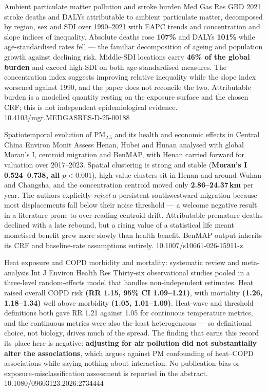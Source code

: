 \documentclass[10pt]{article}
\begin{document}

{Ambient particulate matter pollution and stroke burden}
{Med Gas Res}
{GBD 2021 stroke deaths and DALYs attributable to ambient particulate matter, decomposed
by region, sex and SDI over 1990--2021 with EAPC trends and concentration and slope indices
of inequality. Absolute deaths rose \textbf{107\%} and DALYs \textbf{101\%} while
age-standardised rates fell --- the familiar decomposition of ageing and population growth
against declining risk. Middle-SDI locations carry \textbf{46\% of the global burden} and
exceed high-SDI on both age-standardised measures. The concentration index suggests
improving relative inequality while the slope index worsened against 1990, and the paper
does not reconcile the two. Attributable burden is a modelled quantity resting on the
exposure surface and the chosen CRF; this is not independent epidemiological evidence.}
{10.4103/mgr.MEDGASRES-D-25-00188}

{Spatiotemporal evolution of PM$_{2.5}$ and its health and economic effects in Central
China}
{Environ Monit Assess}
{Henan, Hubei and Hunan analysed with global Moran's I, centroid migration and BenMAP,
with Henan carried forward for valuation over 2017--2023. Spatial clustering is strong and
stable (\textbf{Moran's I 0.524--0.738, all $p<0.001$}), high-value clusters sit in Henan
and around Wuhan and Changsha, and the concentration centroid moved only
\textbf{2.86--24.37\,km} per year. The authors explicitly \emph{reject} a persistent
southwestward migration because most displacements fall below their noise threshold ---
a welcome negative result in a literature prone to over-reading centroid drift.
Attributable premature deaths declined with a late rebound, but a rising value of a
statistical life meant monetised benefit grew more slowly than health benefit. BenMAP
output inherits its CRF and baseline-rate assumptions entirely.}
{10.1007/s10661-026-15911-z}

\clearpage


{Heat exposure and COPD morbidity and mortality: systematic review and meta-analysis}
{Int J Environ Health Res}
{Thirty-six observational studies pooled in a three-level random-effects model that
handles non-independent estimates. Heat raised overall COPD risk
\textbf{(RR 1.15, 95\% CI 1.09--1.21)}, with mortality \textbf{(1.26, 1.18--1.34)} well
above morbidity \textbf{(1.05, 1.01--1.09)}. Heat-wave and threshold definitions both gave
RR 1.21 against 1.05 for continuous temperature metrics, and the continuous metrics were
also the least heterogeneous --- so definitional choice, not biology, drives much of the
spread. The finding that earns this record its place here is negative:
\textbf{adjusting for air pollution did not substantially alter the associations}, which
argues against PM confounding of heat--COPD associations while saying nothing about
interaction. No publication-bias or exposure-misclassification assessment is reported in
the abstract.}
{10.1080/09603123.2026.2734444}
\end{document}
